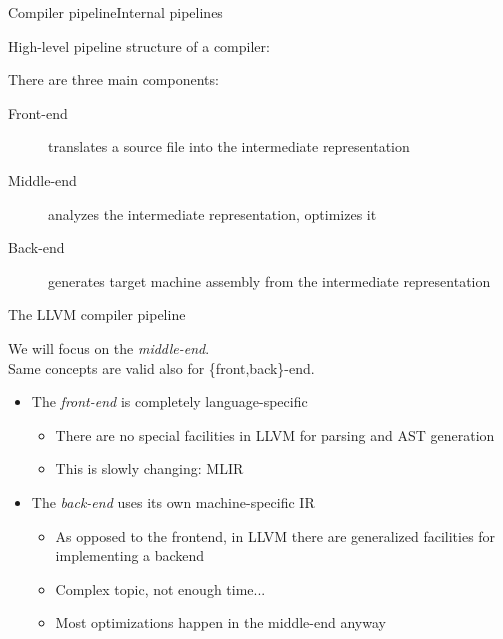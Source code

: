 \begin{frame}{Compiler pipeline}{Internal pipelines}
\begin{center}
High-level pipeline structure of a compiler:\\
\begin{figure}
\centering

\end{figure}
\medskip
There are three main components:

\begin{description}
\item[Front-end] \alert{translates} a source file into the intermediate representation
\item[Middle-end] \alert{analyzes} the intermediate representation, \alert{optimizes}
                  it
\item[Back-end] \alert{generates} target machine assembly from the intermediate
                representation
\end{description}
\end{center}
\end{frame}


\begin{frame}{The LLVM compiler pipeline}
\begin{center}
We will focus on the \emph{middle-end}.\\
{\small Same concepts are valid also for \{front,back\}-end.}\\
\end{center}
\bigskip
\begin{itemize}
\item The \emph{front-end} is completely language-specific
	\begin{itemize}
	\item There are no special facilities in LLVM for parsing and AST generation
	\item This is slowly changing: \alert{MLIR}
	\end{itemize}
\item The \emph{back-end} uses its own machine-specific IR
	\begin{itemize}
	\item As opposed to the frontend, in LLVM there are generalized facilities for implementing a backend
	\item Complex topic, not enough time...
	\item Most optimizations happen in the middle-end anyway
	\end{itemize}
\end{itemize}
\end{frame}


